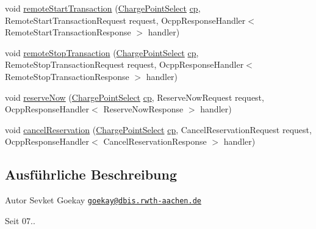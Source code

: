 \begin{DoxyCompactItemize}
\item 
void \hyperlink{classde_1_1rwth_1_1idsg_1_1steve_1_1service_1_1_charge_point_service15___dispatcher_a5667bf41f0a6c3e677322377b16dc0a0}{remote\+Start\+Transaction} (\hyperlink{classde_1_1rwth_1_1idsg_1_1steve_1_1repository_1_1dto_1_1_charge_point_select}{Charge\+Point\+Select} \hyperlink{get_transaction_ids_8js_a02fb69feb56940fd46d72ea6a60e511f}{cp}, Remote\+Start\+Transaction\+Request request, Ocpp\+Response\+Handler$<$ Remote\+Start\+Transaction\+Response $>$ handler)
\item 
void \hyperlink{classde_1_1rwth_1_1idsg_1_1steve_1_1service_1_1_charge_point_service15___dispatcher_a200f857a13ee5fdea3d81fd0634e6dd2}{remote\+Stop\+Transaction} (\hyperlink{classde_1_1rwth_1_1idsg_1_1steve_1_1repository_1_1dto_1_1_charge_point_select}{Charge\+Point\+Select} \hyperlink{get_transaction_ids_8js_a02fb69feb56940fd46d72ea6a60e511f}{cp}, Remote\+Stop\+Transaction\+Request request, Ocpp\+Response\+Handler$<$ Remote\+Stop\+Transaction\+Response $>$ handler)
\item 
void \hyperlink{classde_1_1rwth_1_1idsg_1_1steve_1_1service_1_1_charge_point_service15___dispatcher_a3dc3e949c70d5148b1543bf4fed11579}{reserve\+Now} (\hyperlink{classde_1_1rwth_1_1idsg_1_1steve_1_1repository_1_1dto_1_1_charge_point_select}{Charge\+Point\+Select} \hyperlink{get_transaction_ids_8js_a02fb69feb56940fd46d72ea6a60e511f}{cp}, Reserve\+Now\+Request request, Ocpp\+Response\+Handler$<$ Reserve\+Now\+Response $>$ handler)
\item 
void \hyperlink{classde_1_1rwth_1_1idsg_1_1steve_1_1service_1_1_charge_point_service15___dispatcher_a95e09e473419ae5ea15cffbcc6ff0701}{cancel\+Reservation} (\hyperlink{classde_1_1rwth_1_1idsg_1_1steve_1_1repository_1_1dto_1_1_charge_point_select}{Charge\+Point\+Select} \hyperlink{get_transaction_ids_8js_a02fb69feb56940fd46d72ea6a60e511f}{cp}, Cancel\+Reservation\+Request request, Ocpp\+Response\+Handler$<$ Cancel\+Reservation\+Response $>$ handler)
\end{DoxyCompactItemize}


\subsection{Ausführliche Beschreibung}
\begin{DoxyAuthor}{Autor}
Sevket Goekay \href{mailto:goekay@dbis.rwth-aachen.de}{\tt goekay@dbis.\+rwth-\/aachen.\+de} 
\end{DoxyAuthor}
\begin{DoxySince}{Seit}
07.. 
\end{DoxySince}


